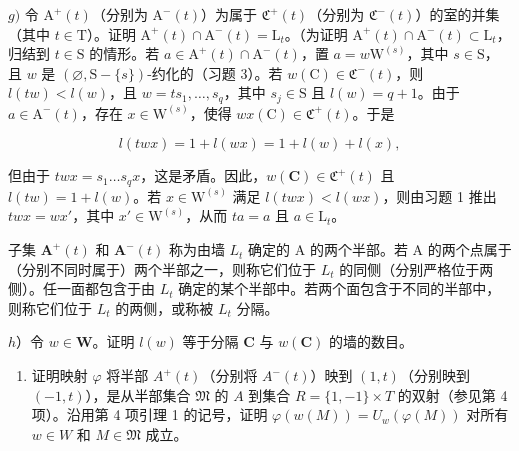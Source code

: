 \(g)\) 令 \(\mathrm{A}^{+}(t)\)（分别为 \(\mathrm{A}^{-}(t)\)）为属于 \(\mathfrak{C}^{+}(t)\)（分别为 \(\mathfrak{C}^{-}(t)\)）的室的并集（其中 \(t \in \mathrm{T}\)）。证明 \(\mathrm{A}^{+}(t) \cap \mathrm{A}^{-}(t) = \mathrm{L}_{t}\)。（为证明 \(\mathrm{A}^{+}(t) \cap \mathrm{A}^{-}(t) \subset \mathrm{L}_{t}\)，归结到 \(t \in \mathrm{S}\) 的情形。若 \(a \in \mathrm{A}^{+}(t) \cap \mathrm{A}^{-}(t)\)，置 \(a = w\mathrm{W}^{(s)}\)，其中 \(s \in \mathrm{S}\)，且 \(w\) 是 \((\varnothing, \mathrm{S} - \{s\})\)-约化的（习题 3）。若 \(w(\mathrm{C}) \in \mathfrak{C}^{-}(t)\)，则 \(l(tw) < l(w)\)，且 \(w = ts_{1}, \ldots, s_{q}\)，其中 \(s_{j} \in \mathrm{S}\) 且 \(l(w) = q + 1\)。由于 \(a \in \mathrm{A}^{-}(t)\)，存在 \(x \in \mathrm{W}^{(s)}\)，使得 \(wx(\mathrm{C}) \in \mathfrak{C}^{+}(t)\)。于是

\[
l (t w x) = 1 + l (w x) = 1 + l (w) + l (x),
\]

但由于 \(twx = s_1 \ldots s_q x\)，这是矛盾。因此，\(w(\mathbf{C}) \in \mathfrak{C}^+(t)\) 且 \(l(tw) = 1 + l(w)\)。若 \(x \in \mathrm{W}^{(s)}\) 满足 \(l(twx) < l(wx)\)，则由习题 1 推出 \(twx = wx'\)，其中 \(x' \in \mathrm{W}^{(s)}\)，从而 \(ta = a\) 且 \(a \in \mathrm{L}_t\)。

子集 \(\mathbf{A}^{+}(t)\) 和 \(\mathbf{A}^{-}(t)\) 称为由墙 \(L_{t}\) 确定的 A 的两个半部。若 A 的两个点属于（分别不同时属于）两个半部之一，则称它们位于 \(L_{t}\) 的同侧（分别严格位于两侧）。任一面都包含于由 \(L_{t}\) 确定的某个半部中。若两个面包含于不同的半部中，则称它们位于 \(L_{t}\) 的两侧，或称被 \(L_{t}\) 分隔。

\(h\)）令 \(w \in \mathbf{W}\)。证明 \(l(w)\) 等于分隔 \(\mathbf{C}\) 与 \(w(\mathbf{C})\) 的墙的数目。

\begin{enumerate}
\def\labelenumi{\roman{enumi})}
\tightlist
\item
  证明映射 \(\varphi\) 将半部 \(A^{+}(t)\)（分别将 \(A^{-}(t)\)）映到 \((1,t)\)（分别映到 \((-1,t)\)），是从半部集合 \(\mathfrak{M}\) 的 \(A\) 到集合 \(R = \{1, - 1\} \times T\) 的双射（参见第 4 项）。沿用第 4 项引理 1 的记号，证明 \(\varphi(w(M)) = U_w(\varphi(M))\) 对所有 \(w\in W\) 和 \(M\in \mathfrak{M}\) 成立。
\end{enumerate}

